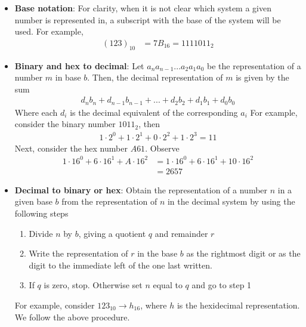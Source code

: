 \documentclass{report}
\begin{document}
\begin{itemize}
\begin{center}
            \end{center}
        \item \textbf{Base notation}: For clarity, when it is not clear which system a given number is represented in, a subscript with the base of the system will be used. For example, 
            \begin{align*}
                (123)_{10} &= 7B_{16} = 1111011_{2}
            \end{align*}
        \item \textbf{Binary and hex to decimal}: Let $a_{n}a_{n-1}...a_{2}a_{1}a_{0} $ be the representation of a number $m$ in base $b$. Then, the decimal representation of $m$ is given by the sum
            \begin{align*}
                d_{n}b_{n} + d_{n-1}b_{n-1} + ... + d_{2}b_{2} +d_{1}b_{1} + d_{0}b_{0}
            \end{align*}
            Where each $d_{i}$ is the decimal equivalent of the corresponding $a_{i}$
            \bigbreak \noindent 
            For example, consider the binary number $1011_{2}$, then
            \begin{align*}
                1\cdot 2^{0} + 1\cdot 2^{1} + 0 \cdot 2^{2} + 1\cdot 2^{3} = 11
            \end{align*}
            Next, consider the hex number $A61$. Observe
            \begin{align*}
                1 \cdot 16^{0} + 6 \cdot 16^{1} + A \cdot 16^{2} &= 1 \cdot 16^{0} + 6 \cdot 16^{1} + 10 \cdot 16^{2} \\
                                                                 &=2657
            \end{align*}
        \item \textbf{Decimal to binary or hex}: Obtain the representation of a number $n$ in a given base $b$ from the representation of $n$ in the decimal system by using the following steps
            \begin{enumerate}
                \item Divide $n$ by $b$, giving a quotient $q$ and remainder $r$
                \item Write the representation of $r$ in the base $b$  as the rightmost digit or as the digit to the immediate left of the one last written.
                \item If $q$ is zero, stop. Otherwise set $n$ equal to $q$ and go to step 1
            \end{enumerate}
            For example, consider $123_{10} \to h_{16} $, where $h$ is the hexidecimal representation. We follow the above procedure.

\end{itemize}
\end{document}
